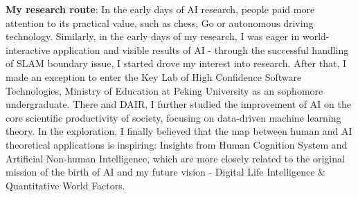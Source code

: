 \documentclass[zh]{resume}
\begin{document}
\textbf{My research route}: In the early days of AI research, people paid more attention to its practical value, such as chess, Go or autonomous driving technology. Similarly, in the early days of my research, I was eager in world-interactive application and visible results of AI - through the successful handling of SLAM boundary issue, I started drove my interest into research. After that, I made an exception to enter the Key Lab of High Confidence Software Technologies, Ministry of Education at Peking University as an sophomore undergraduate. There and DAIR, I further studied the improvement of AI on the core scientific productivity of society, focusing on data-driven machine learning theory. In the exploration, I finally believed that the map between human and AI theoretical applications is inspiring: Insights from Human Cognition System and Artificial Non-human Intelligence, which are more closely related to the original mission of the birth of AI and my future vision - Digital Life Intelligence \& Quantitative World Factors.
\end{document}
